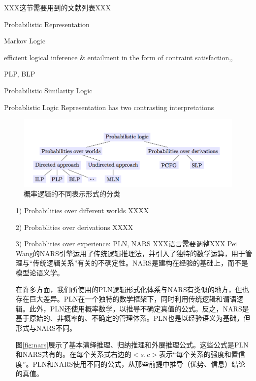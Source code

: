 \begin{enumerate}
XXX这节需要用到的文献列表XXX

Probabilistic Representation \cite{Poon2009}

Markov Logic\cite{Domingos2007}

efficient logical inference \& entailment in the form of contraint satisfaction\cite{Giordani2010a},\cite{Giordani2010b}, \cite{Giordani2009}

PLP, BLP\cite{Kersting2007}

Probabilistic Similarity Logic\cite{Brocheler2012}

Probablistic Logic Representation has two contrasting interpretations\cite{DaRaett2003}




\begin{figure}[htb]
\centering
\includegraphics[width=12cm]{figures/plr-relation.png}
\caption{概率逻辑的不同表示形式的分类}
\label{fig:plr-relation}
\end{figure}

\begin{enumerate}

\item[1)] Probabilities over different worlds
XXXX

\item[2)] Probablities over derivations
XXXX

\item[3)] Probablities over experience: PLN, NARS
XXX语言需要调整XXX
Pei Wang的NARS引擎运用了传统逻辑推理法\cite{Wang2006}，并引入了独特的数学运算，用于管理与“传统逻辑关系”有关的不确定性。NARS是建构在经验的基础上，而不是模型论语义学。

在许多方面，我们所使用的PLN逻辑形式化体系与NARS有类似的地方，但也存在巨大差异。PLN在一个独特的数学框架下，同时利用传统逻辑和谓语逻辑。此外，PLN还使用概率数学，以推导不确定真值的公式。反之，NARS是基于原始的、非概率的、不确定的管理体系。PLN也是以经验语义为基础，但形式与NARS不同。


图\ref{fig:nars}展示了基本演绎推理、归纳推理和外展推理公式。这些公式是PLN和NARS共有的。在每个关系式右边的$<s,c>$表示“每个关系的强度和置信度”。PLN和NARS使用不同的公式，从那些前提中推导（优势、信息）结论的真值。


\end{enumerate}
\end{enumerate}
